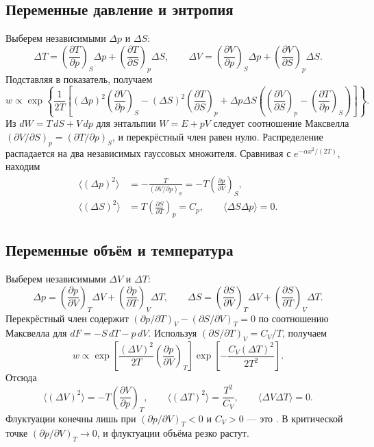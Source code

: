 \documentclass[../final.tex]{subfiles}
\begin{document}
\subsection{Переменные давление и энтропия}
Выберем независимыми $\Delta p$ и $\Delta S$:
\begin{equation*}
 \Delta T=\left(\frac{\partial T}{\partial p}\right)_S\Delta p
 +\left(\frac{\partial T}{\partial S}\right)_p\Delta S,\qquad
 \Delta V=\left(\frac{\partial V}{\partial p}\right)_S\Delta p
 +\left(\frac{\partial V}{\partial S}\right)_p\Delta S.
\end{equation*}
Подставляя в показатель, получаем
\begin{equation*}
 w\propto\exp\left\{\frac1{2T}\left[(\Delta p)^2
 \left(\frac{\partial V}{\partial p}\right)_S
 -(\Delta S)^2\left(\frac{\partial T}{\partial S}\right)_p
 +\Delta p\Delta S\left(\left(\frac{\partial V}{\partial S}\right)_p
 -\left(\frac{\partial T}{\partial p}\right)_S\right)\right]\right\}.
\end{equation*}
Из $dW=T\,dS+V\,dp$ для энтальпии $W=E+pV$ следует соотношение Максвелла
$(\partial V/\partial S)_p=(\partial T/\partial p)_S$, и перекрёстный член
равен нулю. Распределение распадается на два независимых гауссовых множителя.
Сравнивая с $e^{-\alpha x^2/(2T)}$, находим
\begin{align*}
 \langle(\Delta p)^2\rangle&=-\frac{T}{(\partial V/\partial p)_S}
 =-T\left(\frac{\partial p}{\partial V}\right)_S,\\
 \langle(\Delta S)^2\rangle&=T\left(\frac{\partial S}{\partial T}\right)_p=C_p,
 \qquad \langle\Delta S\Delta p\rangle=0.
\end{align*}

\subsection{Переменные объём и температура}
Выберем независимыми $\Delta V$ и $\Delta T$:
\begin{equation*}
 \Delta p=\left(\frac{\partial p}{\partial V}\right)_T\Delta V
 +\left(\frac{\partial p}{\partial T}\right)_V\Delta T,\qquad
 \Delta S=\left(\frac{\partial S}{\partial V}\right)_T\Delta V
 +\left(\frac{\partial S}{\partial T}\right)_V\Delta T.
\end{equation*}
Перекрёстный член содержит
$(\partial p/\partial T)_V-(\partial S/\partial V)_T=0$
по соотношению Максвелла для $dF=-S\,dT-p\,dV$. Используя
$(\partial S/\partial T)_V=C_V/T$, получаем
\begin{equation*}
 w\propto\exp\left[\frac{(\Delta V)^2}{2T}
 \left(\frac{\partial p}{\partial V}\right)_T\right]
 \exp\left[-\frac{C_V(\Delta T)^2}{2T^2}\right].
\end{equation*}
Отсюда
\begin{equation*}
 \langle(\Delta V)^2\rangle=-T\left(\frac{\partial V}{\partial p}\right)_T,\qquad
 \langle(\Delta T)^2\rangle=\frac{T^2}{C_V},\qquad
 \langle\Delta V\Delta T\rangle=0.
\end{equation*}
Флуктуации конечны лишь при $(\partial p/\partial V)_T<0$ и $C_V>0$ ---
это . В критической точке
$(\partial p/\partial V)_T\to0$, и флуктуации объёма резко растут.
\end{document}
